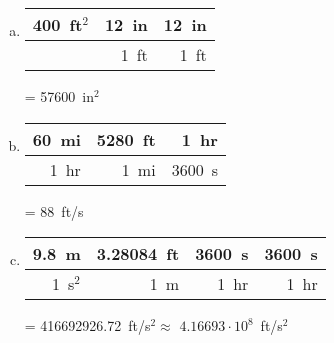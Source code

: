 \documentclass[11pt,letterpaper]{article}
\begin{document}
\sol
\begin{enumerate}[(a)]
\item \phantom{.} \par
	\begin{table}[!ht]
	\centering
	\begin{tabular}{r|r|r}
	400~ft$^2$ & 12~in & 12~in \\ \hline
			  & 1~ft    & 1~ft
	\end{tabular}
	= 57600~in$^2$
	\end{table}

\item \phantom{.} \par
	\begin{table}[!ht]
	\centering
	\begin{tabular}{r|r|r}
	60~mi     & 5280~ft & 1~hr \\ \hline
	1~hr	       & 1~mi     & 3600~s
	\end{tabular}
	= 88~ft/s
	\end{table}

\item \phantom{.} \par
	\begin{table}[!ht]
	\centering
	\begin{tabular}{r|r|r|r}
	9.8~m     & 3.28084~ft & 3600~s & 3600~s \\ \hline
	1~s$^2$ & 1~m		   & 1~hr      & 1~hr
	\end{tabular}
	= 416692926.72~ft/s$^2 \approx$ $4.16693 \cdot 10^8$~ft/s$^2$
	\end{table}
\end{enumerate}
\end{document}
